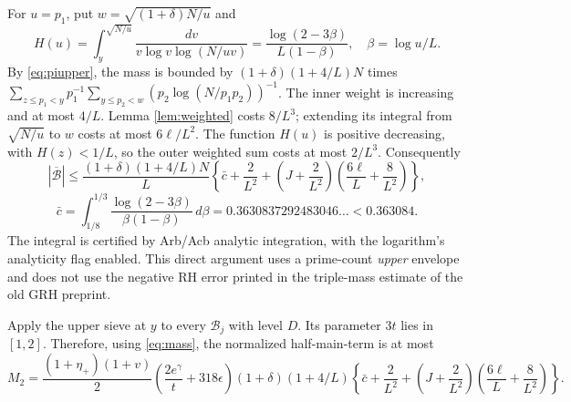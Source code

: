 \documentclass[11pt]{article}
\begin{document}
For $u=p_1$, put $w=\sqrt{(1+\delta)N/u}$ and
\[
H(u)=\int_y^{\sqrt{N/u}}
\frac{dv}{v\log v\log(N/uv)}
=\frac{\log(2-3\beta)}{L(1-\beta)},\quad \beta=\log u/L.
\]
By \eqref{eq:piupper}, the mass is bounded by
$(1+\delta)(1+4/L)N$ times
$\sum_{z\le p_1<y}p_1^{-1}
\sum_{y\le p_2<w}(p_2\log(N/p_1p_2))^{-1}$.
The inner weight is increasing and at most $4/L$.
Lemma \ref{lem:weighted} costs $8/L^3$; extending its integral
from $\sqrt{N/u}$ to $w$ costs at most $6\ell/L^2$.
The function $H(u)$ is positive decreasing, with $H(z)<1/L$,
so the outer weighted sum costs at most $2/L^3$.
Consequently
\begin{equation}\label{eq:mass}
|\overline{\mathcal B}|\le\frac{(1+\delta)(1+4/L)N}{L}
\left\{\bar c+\frac2{L^2}
+\left(J+\frac2{L^2}\right)
\left(\frac{6\ell}{L}+\frac8{L^2}\right)\right\},
\end{equation}
\[
\bar c=\int_{1/8}^{1/3}\frac{\log(2-3\beta)}{\beta(1-\beta)}\,d\beta
=0.3630837292483046\ldots<0.363084.
\]
The integral is certified by Arb/Acb analytic integration, with the
logarithm's analyticity flag enabled. This direct argument uses a
prime-count \emph{upper} envelope and does not use the negative RH
error printed in the triple-mass estimate of the old GRH preprint.

Apply the upper sieve at $y$ to every $\mathcal B_j$ with level $D$.
Its parameter $3t$ lies in $[1,2]$. Therefore, using \eqref{eq:mass},
the normalized half-main-term is at most
\begin{equation}\label{eq:switch}
M_2=\frac{(1+\eta_+)(1+v)}{2}\left(\frac{2e^\gamma}{t}+318\epsilon\right)
(1+\delta)(1+4/L)
\left\{\bar c+\frac2{L^2}+
\left(J+\frac2{L^2}\right)\left(\frac{6\ell}{L}+\frac8{L^2}\right)\right\}.
\end{equation}
\end{document}

